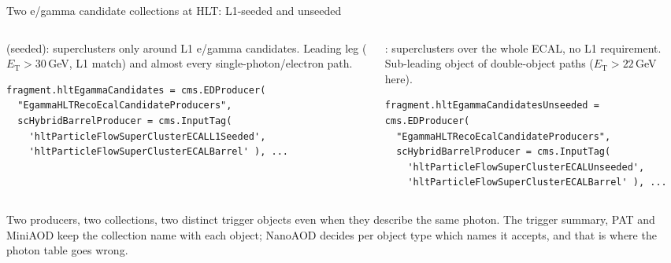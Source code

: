 \begin{frame}[fragile]{Two e/gamma candidate collections at HLT: L1-seeded and unseeded}
  \begin{columns}[T]
    \begin{column}{0.49\linewidth}
      {\small\hl{} (seeded): superclusters only around L1 e/gamma candidates.
       Leading leg ($E_\mathrm{T}>30$\,GeV, L1 match) and almost every single-photon/electron path.}
\begin{lstlisting}
fragment.hltEgammaCandidates = cms.EDProducer(
  "EgammaHLTRecoEcalCandidateProducers",
  scHybridBarrelProducer = cms.InputTag(
    'hltParticleFlowSuperClusterECALL1Seeded',
    'hltParticleFlowSuperClusterECALBarrel' ), ...
\end{lstlisting}
    \end{column}
    \begin{column}{0.49\linewidth}
      {\small{}: superclusters over the whole ECAL, no L1 requirement.
       Sub-leading object of double-object paths ($E_\mathrm{T}>22$\,GeV here).}
\begin{lstlisting}
fragment.hltEgammaCandidatesUnseeded = cms.EDProducer(
  "EgammaHLTRecoEcalCandidateProducers",
  scHybridBarrelProducer = cms.InputTag(
    'hltParticleFlowSuperClusterECALUnseeded',
    'hltParticleFlowSuperClusterECALBarrel' ), ...
\end{lstlisting}
    \end{column}
  \end{columns}
  \par\vspace{6pt}
  {\small Two producers, two collections, two distinct trigger objects even when they describe the same photon.
  The trigger summary, PAT and MiniAOD keep the collection name with each object; NanoAOD decides per object type
  which names it accepts, and that is where the photon table goes wrong.}
\end{frame}

